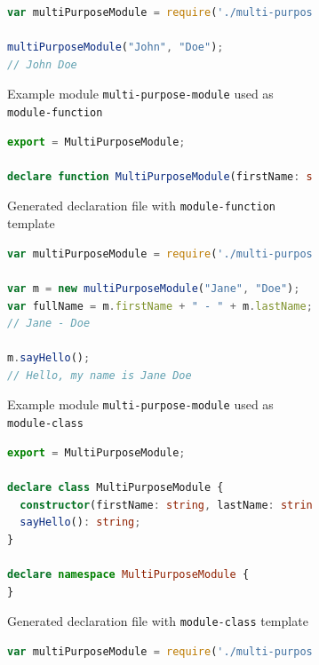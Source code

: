 \documentclass[english,cleveref,autoref,submission]{programming}
\begin{document}
\begin{figure}[tp]
  \centering
  \begin{subfigure}{0.48\linewidth}
    \begin{lstlisting}[language=JavaScript]
var multiPurposeModule = require('./multi-purpose-module');

multiPurposeModule("John", "Doe");
// John Doe
    \end{lstlisting}
    \caption{Example module \texttt{multi-purpose-module} used as \texttt{module-function}}
  \end{subfigure}
  \hfill
  \begin{subfigure}{0.48\linewidth}
    \begin{lstlisting}[language=TypeScript]
export = MultiPurposeModule;

declare function MultiPurposeModule(firstName: string, lastName: string): string;
    \end{lstlisting}
    \caption{Generated declaration file with \texttt{module-function} template}
  \end{subfigure}

  \begin{subfigure}{0.48\linewidth}
    \begin{lstlisting}[language=JavaScript]
var multiPurposeModule = require('./multi-purpose-module');

var m = new multiPurposeModule("Jane", "Doe");
var fullName = m.firstName + " - " + m.lastName;
// Jane - Doe

m.sayHello();
// Hello, my name is Jane Doe
    \end{lstlisting}
    \caption{Example module \texttt{multi-purpose-module} used as \texttt{module-class}}
    \end{subfigure}
    \hfill
    \begin{subfigure}{0.48\linewidth}
      \begin{lstlisting}[language=TypeScript]
export = MultiPurposeModule;

declare class MultiPurposeModule {
  constructor(firstName: string, lastName: string);
  sayHello(): string;
}

declare namespace MultiPurposeModule {
}
      \end{lstlisting}
      \caption{Generated declaration file with \texttt{module-class} template}
    \end{subfigure}


    \begin{subfigure}{0.48\linewidth}
      \begin{lstlisting}[language=JavaScript]
var multiPurposeModule = require('./multi-purpose-module');


\end{lstlisting}
\end{subfigure}
\end{figure}
\end{document}
